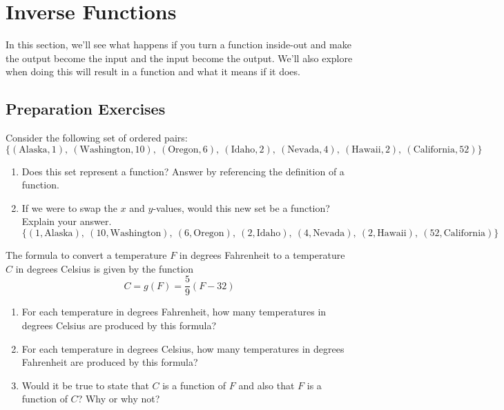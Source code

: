 
\section{Inverse Functions} \label{functions-inverse}

In this section, we'll see what happens if you turn a function inside-out and make the output become the input and the input become the output.  We'll also explore when doing this will result in a function and what it means if it does.   \\[0.5em]


\subsection*{Preparation Exercises} \label{prep-functions-inverse}

\begin{myPrep}
Consider the following set of ordered pairs:\\
$$ \{ (\text{Alaska}, 1), ~ (\text{Washington},10), ~ (\text{Oregon},6), ~ (\text{Idaho}, 2),~ (\text{Nevada}, 4),~ (\text{Hawaii}, 2),~ (\text{California}, 52)\} $$
\begin{enumerate}
	\item Does this set represent a function?  Answer by referencing the definition of a function.
	\vfill
	\item If we were to swap the $x$ and $y$-values, would this new set be a function? Explain your answer.\\ 
$ \{ (1, \text{Alaska}), ~ (10, \text{Washington}), ~ (6, \text{Oregon}), ~ (2, \text{Idaho}),~ (4, \text{Nevada}),~ (2, \text{Hawaii}),~ (52, \text{California})\} $
	\vfill
\end{enumerate}
\end{myPrep}

\begin{myPrep}
The formula to convert a temperature $F$ in degrees Fahrenheit to a temperature $C$ in degrees Celsius is given by the function
\[ C = g(F) = \frac{5}{9}(F-32)  \]

\begin{enumerate}
	\item For each temperature in degrees Fahrenheit, how many temperatures in degrees Celsius are produced by this formula?
	\vfill
	\item For each temperature in degrees Celsius, how many temperatures in degrees Fahrenheit are produced by this formula?
	\vfill
	\item Would it be true to state that $C$ is a function of $F$ and also that $F$ is a function of $C$?  Why or why not?
	\vfill

\end{enumerate}
\end{myPrep}



